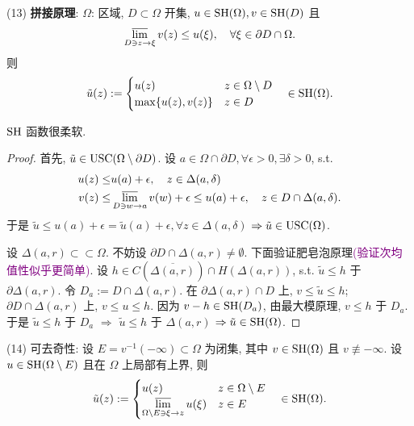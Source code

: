 \noindent (13) \textbf{拼接原理}: $\Omega $: 区域, $D \subset \Omega $ 开集, $u \in \operatorname{SH}(\Omega ), v \in \operatorname{SH}(D)$ 且 
$$ \varlimsup _{D \ni z \to \xi } v(z) \leq u(\xi ), \quad \forall \xi \in \partial D \cap \Omega  .$$   
则 
$$ \tilde{u}(z):= \begin{cases}
  u(z) &\text{} z \in \Omega \setminus D\\
  \max \{u(z),v(z)\} &\text{} z \in D
\end{cases}  \quad \in \operatorname{SH} (\Omega ). $$
\begin{remark}
  $\operatorname{SH}$ 函数很柔软. 
\end{remark}
\begin{proof}
  首先, $\tilde{u} \in \operatorname{USC} (\Omega \setminus \partial D)$. 
  设 $a \in \Omega  \cap \partial D, \forall \epsilon >0, \exists \delta >0$, s.t. 
  $$ \begin{aligned}
    u(z) \leq& u(a)+\epsilon , \quad z \in \Delta (a,\delta )\\
   v(z) \leq & \varlimsup_{D \ni w \to a} v(w)+\epsilon  \leq  u(a)+\epsilon, \quad z \in D \cap \Delta (a,\delta ).
  \end{aligned}  $$  
  于是 $\tilde{u} \leq u(a)+\epsilon =\tilde{u}(a)+\epsilon , \forall z \in \Delta (a,\delta )$ $\Rightarrow \tilde{u} \in \operatorname{USC} (\Omega )$.
  
  设 $\Delta (a,r) \subset \subset \Omega $. 不妨设 $\partial D \cap \Delta (a,r) \neq \emptyset $. 
  下面验证肥皂泡原理\textcolor{purple}{(验证次均值性似乎更简单)}. 
  设 $h \in C(\overline{\Delta (a,r)}) \cap H(\Delta (a,r))$, s.t. $\tilde{u} \leq h$ 于 $\partial \Delta (a,r)$.     
  令 $D_a:=D \cap \Delta (a,r)$. 在 $\partial \Delta (a,r) \cap D$ 上, $v \leq \tilde{u} \leq h$; $\partial D \cap  \Delta (a,r) $ 上, $v \leq u \leq h$. 
  因为 $v -h \in \operatorname{SH}(D_a)$, 由最大模原理, 
  $v \leq h$ 于 $D_a$. 于是 $\tilde{u} \leq h$ 于 $D_a$ $\Rightarrow $  $\tilde{u} \leq h$ 于 $\Delta (a,r)$   $\Rightarrow \tilde{u} \in \operatorname{SH}(\Omega )$.      
\end{proof}


\noindent (14) 可去奇性: 
设 $E=v^{-1}(-\infty ) \subset \Omega $ 为闭集, 其中 $v \in \operatorname{SH} (\Omega )$ 且 $v \not \equiv -\infty $.   设 $u \in \operatorname{SH}(\Omega \setminus  E)$ 且在 $\Omega $ 上局部有上界, 则 
$$ \tilde{u}(z):= \begin{cases}
  u(z) &\text{} z \in \Omega \setminus  E\\
  \varlimsup \limits_{\Omega \setminus E \ni \xi \to z} u(\xi )&\text{} z \in E 
\end{cases}  \quad \in \operatorname{SH}(\Omega ) .$$  

